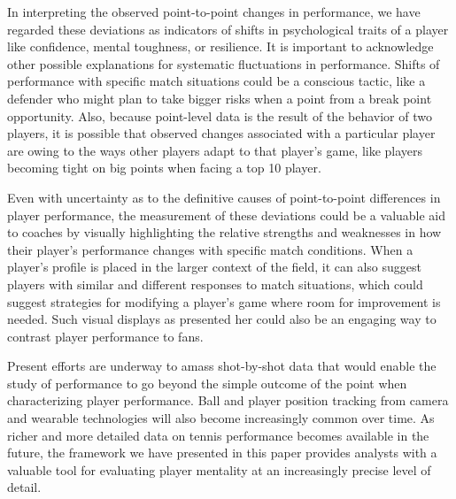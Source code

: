 \documentclass{Latex/svjour3}
\begin{document}
In interpreting the observed point-to-point changes in performance, we have
regarded these deviations as indicators of shifts in psychological traits of a
player like confidence, mental toughness, or resilience. It is important to
acknowledge other possible explanations for systematic fluctuations in
performance. Shifts of performance with specific match situations could be a
conscious tactic, like a defender who might plan to take bigger risks when a
point from a break point opportunity. Also, because point-level data is the
result of the behavior of two players, it is possible that observed changes
associated with a particular player are owing to the ways other players adapt to
that player's game, like players becoming tight on big points when facing a top
10 player.

Even with uncertainty as to the definitive causes of point-to-point differences
in player performance, the measurement of these deviations could be a valuable
aid to coaches by visually highlighting the relative strengths and weaknesses in
how their player's performance changes with specific match conditions. When a
player's profile is placed in the larger context of the field, it can also
suggest players with similar and different responses to match situations, which
could suggest strategies for modifying a player's game where room for
improvement is needed. Such visual displays as presented her could also be an
engaging way to contrast player performance to fans.

Present efforts are underway to amass shot-by-shot data that would enable the
study of performance to go beyond the simple outcome of the point when
characterizing player performance. Ball and player position tracking from camera
and wearable technologies will also become increasingly common over time. As
richer and more detailed data on tennis performance becomes available in the
future, the framework we have presented in this paper provides analysts with a
valuable tool for evaluating player mentality at an increasingly precise level
of detail.

 


\clearpage
\end{document}
